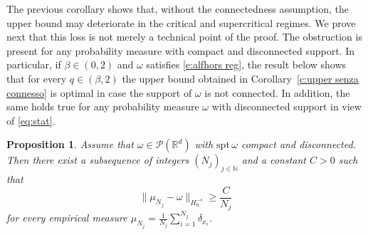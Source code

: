\documentclass[12pt,a4paper,oneside]{amsart}
\theoremstyle{plain}
\newtheorem{proposition}[theorem]{Proposition}
\theoremstyle{definition}
\numberwithin{equation}{section}
\numberwithin{figure}{section}
\numberwithin{table}{section}
\theoremstyle{remark}
\newcommand{\R}{\mathbb{R}}
\newcommand{\expAhlfors}{\beta}
\begin{document}
The previous corollary shows that, without the connectedness assumption, the upper bound may deteriorate in the critical and supercritical regimes.
We prove next that this loss is not merely a technical point of the proof. The obstruction is present for any probability measure with compact and disconnected support. In particular, if $\expAhlfors\in(0,2)$ and $\omega$ satisfies \eqref{e:alfhors reg}, the result below shows that for every $q\in(\expAhlfors,2)$ the upper bound obtained in Corollary~\ref{c:upper senza connesso} is optimal in case the support of $\omega$ is not connected. In addition, the same holds true for any probability measure $\omega$ with disconnected support in view of 
\eqref{eq:stat}.
\begin{proposition}
    Assume that $\omega\in \mathcal{P}(\R^d)$ with $\mathrm{spt}\,\omega$ compact and disconnected. Then there exist a subsequence of integers $(N_j)_{j\in\mathbb N}$ and a constant $C>0$ such that 
    \[
     \|\mu_{N_j}-\omega\|_{H_0^{-s}}\geq \frac{C}{N_j}
    \]
    for every empirical measure $\mu_{N_j}=\frac1{N_j}\sum_{i=1}^{N_j}\delta_{x_i}$.
\end{proposition}
\end{document}
